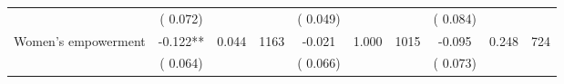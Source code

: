 \begin{tabular}{l*{9}{c}}
                               &        (       0.072) & &                                                                &       (       0.049) & &                                                         &       (       0.084) & & \\ 
 Women's empowerment                &             -0.122**        &        0.044 & 1163        &             -0.021 &        1.000 & 1015               &       -0.095 &        0.248 & 724       \\ 
                               &        (       0.064) & &                                                                &       (       0.066) & &                                                         &       (       0.073) & & \\ 
\hline \end{tabular}                                                                                                                                                      